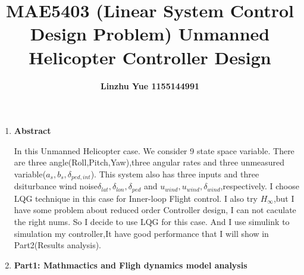 \documentclass[12pt, a4paper]{article}
\title{MAE5403 (Linear System Control Design Problem) \textbf {Unmanned Helicopter Controller Design} }
\author{\textbf {Linzhu Yue 1155144991}}
\begin{document}
 
\maketitle
\begin{enumerate}[1.]\setlength{\itemsep}{1cm}

\item  \textbf{Abstract}


\hspace{0.5em}In this Unmanned Helicopter case. We consider 9 state space variable. There are three angle(Roll,Pitch,Yaw),three angular rates and three unmeasured
variable($a_s,b_s,\delta_{ped,int}$). This system also has three inputs and three dsiturbance wind noise$\delta_{lat},\delta_{lon},\delta_{ped}$ and $u_{wind},u_{wind},\delta_{wind}$,respectively.
I choose LQG technique in this case for Inner-loop Flight control. I also try $H_{\infty}$,but I have some problem about reduced order Controller design,
I can not caculate the right nums. So I decide to use LQG for this case. And I use simulink to simulation my controller,It have good performance that I will show in Part2(Results analysis).

\item  \textbf{ Part1: Mathmactics and Fligh dynamics model analysis}
\end{enumerate}
\end{document}

